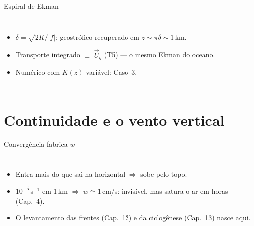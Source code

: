 \documentclass[aspectratio=169,11pt]{beamer}
\begin{document}
\begin{frame}{Espiral de Ekman}
  \begin{columns}
    \vspace{0.4em}
    \begin{itemize}
      \item $\delta = \sqrt{2K/|f|}$; geostrófico recuperado em
            $z \sim \pi\delta \sim 1$\,km.
      \item Transporte integrado $\perp$ $\vec U_g$ (T5) — o mesmo
            Ekman do oceano.
      \item Numérico com $K(z)$ variável: Caso~3.
    \end{itemize}
  \end{columns}
\end{frame}

\section{Continuidade e o vento vertical}

\begin{frame}{Convergência fabrica $w$}
  \begin{columns}
    \vspace{0.4em}
    \begin{itemize}
      \item Entra mais do que sai na horizontal $\Rightarrow$ sobe
            pelo topo.
      \item $10^{-5}$\,s$^{-1}$ em 1\,km $\Rightarrow$
            $w \simeq 1$\,cm/s: invisível, mas satura o ar em horas
            (Cap.~4).
      \item O levantamento das frentes (Cap.~12) e da ciclogênese
            (Cap.~13) nasce aqui.
    \end{itemize}
  \end{columns}
\end{frame}
\end{document}
